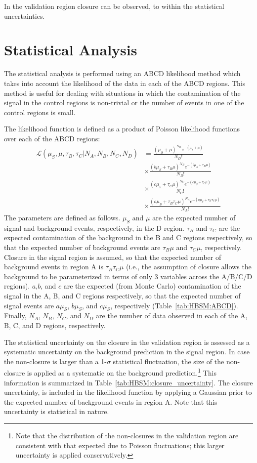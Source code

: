 In the validation region closure can be observed, to within the statistical uncertainties.

\FloatBarrier
\section{Statistical Analysis}
\label{sec:HBSM:statanalysis}
The statistical analysis is performed using an ABCD likelihood method which takes into account the likelihood of the data in each of the ABCD regions. This method is useful for dealing with situations in which the contamination of the signal in the control regions is non-trivial or the number of events in one of the control regions is small.

The likelihood function is defined as a product of Poisson likelihood functions over each of the ABCD regions:
\begin{align}
  \mathcal{L}(\mu_S,\mu,\tau_B,\tau_C|N_A,N_B,N_C,N_D) &= \frac{(\mu_S+\mu)^{N_D}e^{-(\mu_S+\mu)}}{N_D!}\nonumber\\
  &\times\frac{(b\mu_S+\tau_B\mu)^{N_B}e^{-(b\mu_S+\tau_B\mu)}}{N_B!}\nonumber\\
  &\times\frac{(c\mu_S+\tau_C\mu)^{N_C}e^{-(c\mu_S+\tau_C\mu)}}{N_C!}\nonumber\\
  &\times\frac{(a\mu_S+\tau_B\tau_C\mu)^{N_A}e^{-(a\mu_S+\tau_B\tau_C\mu)}}{N_A!}
  \label{eqn:HBSM:likelihood}
\end{align}
The parameters are defined as follows. $\mu_S$ and $\mu$ are the expected number of signal and background events, respectively, in the D region. 
$\tau_B$ and $\tau_C$ are the expected contamination of the background in the B and C regions respectively, 
so that the expected number of background events are $\tau_B\mu$ and $\tau_C\mu$, respectively. 
Closure in the signal region is assumed, 
so that the expected number of background events in region A is $\tau_B\tau_C\mu$ (i.e., the assumption of closure allows the background to be parameterized in terms of only 3 variables across the A/B/C/D regions).
$a$,$b$, and $c$ are the expected (from Monte Carlo) contamination of the signal in the A, B, and C regions respectively, so that the expected number of signal events are $a\mu_S$, $b\mu_S$, and $c\mu_S$, respectively (Table~\ref{tab:HBSM:ABCD}). 
Finally, $N_A$, $N_B$, $N_C$, and $N_D$ are the number of data observed in each of the A, B, C, and D regions, respectively.

The statistical uncertainty on the closure in the validation region is assessed as a systematic uncertainty on the background prediction in the signal region.
In case the non-closure is larger than a 1-$\sigma$ statistical fluctuation, the size of the non-closure is applied as a systematic on the background prediction.\footnote{Note that the distribution of the non-closures in the validation region are consistent with that expected due to Poisson fluctuations; this larger uncertainty is applied conservatively.}
This information is summarized in Table~\ref{tab:HBSM:closure_uncertainty}.
The closure uncertainty, is included in the likelihood function by applying a Gaussian prior
to the expected number of background events in region A.
Note that this uncertainty is statistical in nature.

